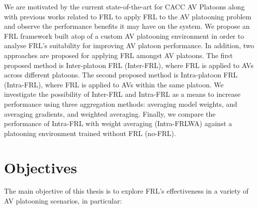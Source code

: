 We are motivated by the current state-of-the-art for CACC AV Platoons along with previous
works related to FRL to apply FRL to the AV platooning problem and observe the performance
benefits it may have on the system.  We propose an FRL framework built atop of a custom AV
platooning environment in order to analyse FRL's suitability for improving AV platoon performance.
In addition, two approaches are proposed for applying FRL amongst AV platoons. The first proposed
method is Inter-platoon FRL (Inter-FRL), where FRL is applied to AVs across different platoons.
The second proposed method is Intra-platoon FRL (Intra-FRL), where FRL is applied to AVs
within the same platoon.  We investigate the possibility of Inter-FRL and Intra-FRL as a
means to increase performance using three aggregation methods: averaging model weights,
and averaging gradients, and weighted averaging.  Finally, we compare the performance
of Intra-FRL with weight averaging (Intra-FRLWA) against a platooning environment trained
without FRL (no-FRL).

\section{Objectives}
The main objective of this thesis is to explore FRL's effectiveness in a variety of AV
platooning scenarios, in particular:

